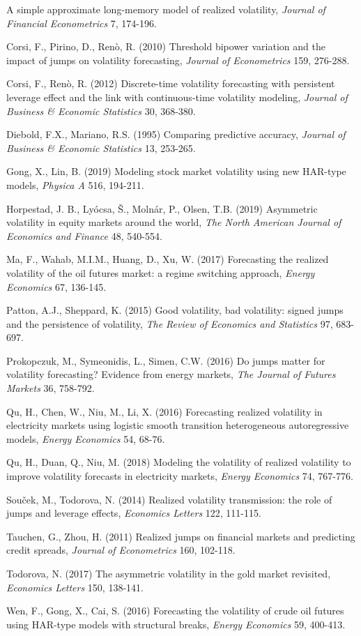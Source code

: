 \documentclass[10pt]{article}
\begin{document}
\begin{thebibliography}{99}
A simple approximate long-memory model of realized volatility, 
\textit{Journal of Financial Econometrics} 7, 174-196. 
\item[Corsi, F., Pirino, D., Ren\`{o}, R. (2010)] 
Threshold bipower variation and the impact of jumps on volatility forecasting, 
\textit{Journal of Econometrics} 159, 276-288. 
\item[Corsi, F., Ren\`{o}, R. (2012)] 
Discrete-time volatility forecasting with persistent leverage effect and the link with continuous-time volatility modeling, 
\textit{Journal of Business \& Economic Statistics} 30, 368-380. 
\item[Diebold, F.X., Mariano, R.S. (1995)] 
Comparing predictive accuracy, 
\textit{Journal of Business \& Economic Statistics} 13, 253-265. 
\item[Gong, X., Lin, B. (2019)]
Modeling stock market volatility using new HAR-type models, 
\textit{Physica A} 516, 194-211.
\item[Horpestad, J. B., Ly\'{o}csa, \v{S}., Moln\'{a}r, P., Olsen, T.B. (2019)]
Asymmetric volatility in equity markets around the world, 
\textit{The North American Journal of Economics and Finance} 48, 540-554.
\item[Ma, F., Wahab, M.I.M., Huang, D., Xu, W. (2017)]
Forecasting the realized volatility of the oil futures market: a regime switching approach, 
\textit{Energy Economics} 67, 136-145. 
\item[Patton, A.J., Sheppard, K. (2015)] 
Good volatility, bad volatility: signed jumps and the persistence of volatility, 
\textit{The Review of Economics and Statistics} 97, 683-697.
\item[Prokopczuk, M., Symeonidis, L., Simen, C.W. (2016)]
Do jumps matter for volatility forecasting? Evidence from energy markets, 
\textit{The Journal of Futures Markets} 36, 758-792. 
\item[Qu, H., Chen, W., Niu, M., Li, X. (2016)]
Forecasting realized volatility in electricity markets using logistic smooth transition heterogeneous autoregressive models, 
\textit{Energy Economics} 54, 68-76. 
\item[Qu, H., Duan, Q., Niu, M. (2018)] 
Modeling the volatility of realized volatility to improve volatility forecasts in electricity markets, 
\textit{Energy Economics} 74, 767-776. 
\item[Sou\v{c}ek, M., Todorova, N. (2014)] 
Realized volatility transmission: the role of jumps and leverage effects, 
\textit{Economics Letters} 122, 111-115. 
\item[Tauchen, G., Zhou, H. (2011)]  
Realized jumps on financial markets and predicting credit spreads, 
\textit{Journal of Econometrics} 160, 102-118. 
\item[Todorova, N. (2017)] 
The asymmetric volatility in the gold market revisited, 
\textit{Economics Letters} 150, 138-141. 
\item[Wen, F., Gong, X., Cai, S. (2016)] 
Forecasting the volatility of crude oil futures using HAR-type models with structural breaks, 
\textit{Energy Economics} 59, 400-413.

\end{thebibliography}
\end{document}
